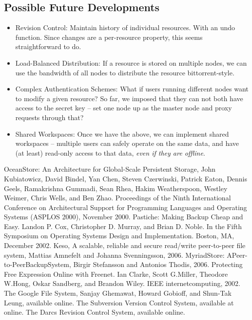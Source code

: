 \documentclass[11pt]{article}
\begin{document}
\begin{mainmatter}
\section{Possible Future Developments}

\begin{itemize}
\item Revision Control:
Maintain history of individual resources. With an undo function. Since changes are a per-resource property, this seems straightforward to do.

\item Load-Balanced Distribution:
If a resource is stored on multiple nodes, we can use the bandwidth of all nodes to distribute the resource bittorrent-style.

\item Complex Authentication Schemes:
What if users running different nodes want to modify a given resource? So far, we imposed that they can not both have access to the secret key -- set one node up as the master node and proxy requests through that?

\item Shared Workspaces:
Once we have the above, we can implement shared workspaces -- multiple users can safely operate on the same data, and have (at least) read-only access to that data, \emph{even if they are offline}.
\end{itemize}

\end{mainmatter}

\begin{thebibliography}{99}
 OceanStore: An Architecture for Global-Scale Persistent Storage, John Kubiatowicz, David Bindel, Yan Chen, Steven Czerwinski, Patrick Eaton, Dennis Geels, Ramakrishna Gummadi, Sean Rhea, Hakim Weatherspoon, Westley Weimer, Chris Wells, and Ben Zhao. Proceedings of the Ninth International Conference on Architectural Support for Programming Languages and Operating Systems (ASPLOS 2000), November 2000.
 Pastiche: Making Backup Cheap and Easy. Landon P. Cox, Christopher D. Murray, and Brian D. Noble.  In the Fifth Symposium on Operating Systems Design and Implementation. Boston, MA, December 2002.
 Keso, A scalable, reliable and secure read/write peer-to-peer file system, Mattias Amnefelt and
Johanna Svenningsson, 2006.
 MyriadStore: APeer-to-PeerBackupSystem, Birgir Stefansson and Antonios Thodis, 2006. 
 Protecting Free Expression Online with Freenet. Ian Clarke, Scott G.Miller, Theodore W.Hong, Oskar Sandberg, and Brandon Wiley. IEEE internetcomputing,  2002.
 The Google File System, Sanjay Ghemawat, Howard Gobioff, and Shun-Tak Leung, available online.
 The Subversion Version Control System, available at online.
 The Darcs Revision Control System, available online.
\end{thebibliography}
\end{document}
